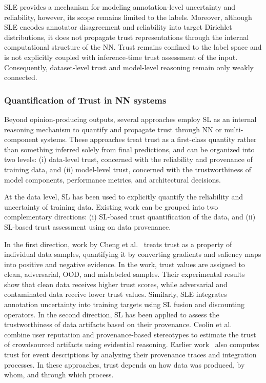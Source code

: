 \ac{SLE} provides a mechanism for modeling annotation-level uncertainty and reliability, however, its scope remains limited to the labels. Moreover, although \ac{SLE} encodes annotator disagreement and reliability into target Dirichlet distributions, it does not propagate trust representations through the internal computational structure of the \ac{NN}. Trust remains confined to the label space and is not explicitly coupled with inference-time trust assessment of the input. Consequently, dataset-level trust and model-level reasoning remain only weakly connected.

\subsubsection{Quantification of Trust in \ac{NN} systems}

Beyond opinion-producing outputs, several approaches employ \ac{SL} as an internal reasoning mechanism to quantify and propagate trust through \ac{NN} or multi-component systems. These approaches treat trust as a first-class quantity rather than something inferred solely from final predictions, and can be organized into two levels: (i) data-level trust, concerned with the reliability and provenance of training data, and (ii) model-level trust, concerned with the trustworthiness of model components, performance metrics, and architectural decisions.

At the data level, \ac{SL} has been used to explicitly quantify the reliability and uncertainty of training data. Existing work can be grouped into two complementary directions: (i) \ac{SL}-based trust quantification of the data, and (ii) \ac{SL}-based trust assessment using on data provenance.

In the first direction, work by Cheng et al.~\cite{pmlr-v199-cheng22a} treats trust as a property of individual data samples, quantifying it by converting gradients and saliency maps into positive and negative evidence. In the work, trust values are assigned to clean, adversarial, \ac{OOD}, and mislabeled samples. Their experimental results show that clean data receives higher trust scores, while adversarial and contaminated data receive lower trust values. Similarly, \ac{SLE}\cite{SLencodings} integrates annotation uncertainty into training targets using \ac{SL} fusion and discounting operators. In the second direction, \ac{SL} has been applied to assess the trustworthiness of data artifacts based on their provenance. Ceolin et al.~\cite{10.1145/2818382} combine user reputation and provenance-based stereotypes to estimate the trust of crowdsourced artifacts using evidential reasoning. Earlier work~\cite{ceolin2010calculating} also computes trust for event descriptions by analyzing their provenance traces and integration processes. In these approaches, trust depends on how data was produced, by whom, and through which process.


